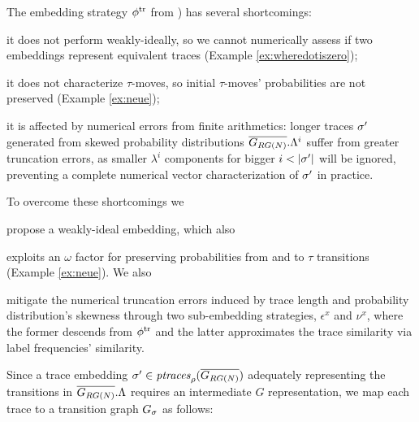 {{The embedding strategy} $\trembed$ from \cite{LodhiSSCW02,Raedt}) {has several short\-comings:} 
\begin{alphalist} 
 \item it does not perform weakly-ideally, so we cannot numerically assess if two embeddings represent equivalent traces (Example \ref{ex:wheredotiszero}); 
 \item it does not characterize $\tau$-moves, so initial $\tau$-moves' probabilities are not preserved (Example \ref{ex:neue}); 
 \item it is affected by numerical errors from finite arithmetics: longer traces $\nonlogtrace$ generated from skewed probability distributions $\expN.\Lambda^i$ suffer from greater truncation errors, as smaller $\lambda^i$ components for bigger $i<|\nonlogtrace|$ will be ignored, preventing a complete numerical vector characterization of  $\nonlogtrace$ in practice.
\end{alphalist}

{To overcome these shortcomings we} \begin{alphalist} \item propose a weakly-ideal embedding, which also \item exploits an 
$\omega$ factor for preserving probabilities from and to $\tau$ transitions (Example \ref{ex:neue}). We also \item mitigate the 
numerical truncation errors induced by trace length and probability distribution's skewness through two sub-embedding strategies, 
$\epsilon^x$ and $\nu^x$, where the former descends from $\trembed$ and the latter approximates the trace similarity via label frequencies' similarity.
\end{alphalist}

Since a trace embedding $\nonlogtrace\in\WCal{\pmin}{n}$ adequately representing the transitions in $\expN.\Lambda$ requires an intermediate $G$ representation, we map each trace to a transition graph $\tg_\sigma$ as follows:}
